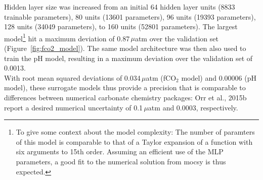 \documentclass{article}
\begin{document}
	Hidden layer size was increased from an initial 64 hidden layer units (8833 trainable parameters), 80 units (13601 parameters), 96 units (19393 parameters), 128 units (34049 parameters), to 160 units (52801 parameters). The largest model\footnote{To give some context about the model complexity: The number of paramters of this model is comparable to that of a Taylor expansion of a function with six arguments to 15th order. Assuming an efficient use of the MLP parameters, a good fit to the numerical solution from mocsy is thus expected.} hit a maximum deviation of 0.87\,$\mu$atm over the validation set (Figure~\ref{fig:fco2_model}).
	The same model architecture was then also used to train the pH model, %
	resulting in a maximum deviation over the validation set of 0.0013. \\
	With root mean squared deviations of 0.034\,$\mu$atm (fCO$_2$ model) and 0.00006 (pH model), these surrogate models thus provide a precision that is comparable to differences between numerical carbonate chemistry packages: Orr et al., 2015b report a desired numerical uncertainty of 0.1\,$\mu$atm and 0.0003, respectively.
	
\end{document}
